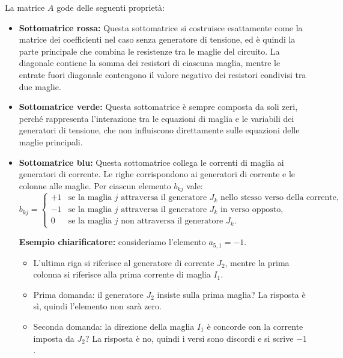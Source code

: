 La matrice $A$ gode delle seguenti proprietà:
\begin{itemize}
    \item \textbf{Sottomatrice rossa:} Questa sottomatrice si costruisce esattamente come la matrice dei coefficienti nel caso senza generatore di tensione, ed è quindi la parte principale che combina le resistenze tra le maglie del circuito. La diagonale contiene la somma dei resistori di ciascuna maglia, mentre le entrate fuori diagonale contengono il valore negativo dei resistori condivisi tra due maglie.

    \item \textbf{Sottomatrice verde:} Questa sottomatrice è sempre composta da soli zeri, perché rappresenta l’interazione tra le equazioni di maglia e le variabili dei generatori di tensione, che non influiscono direttamente sulle equazioni delle maglie principali.
    \item \textbf{Sottomatrice blu:} Questa sottomatrice collega le correnti di maglia ai generatori di corrente. Le righe corrispondono ai generatori di corrente e le colonne alle maglie. Per ciascun elemento \(b_{kj}\) vale:
          \[
              b_{kj} =
              \begin{cases}
                  +1 & \text{se la maglia } j \text{ attraversa il generatore } J_k \text{ nello stesso verso della corrente}, \\
                  -1 & \text{se la maglia } j \text{ attraversa il generatore } J_k \text{ in verso opposto},                  \\
                  0  & \text{se la maglia } j \text{ non attraversa il generatore } J_k.
              \end{cases}
          \]

          \textbf{Esempio chiarificatore:} consideriamo l'elemento \(a_{5,1} = -1\).
          \begin{itemize}
              \item L'ultima riga si riferisce al generatore di corrente \(J_2\), mentre la prima colonna si riferisce alla prima corrente di maglia \(I_1\).
              \item Prima domanda: il generatore \(J_2\) insiste sulla prima maglia? La risposta è sì, quindi l’elemento non sarà zero.
              \item Seconda domanda: la direzione della maglia \(I_1\) è concorde con la corrente imposta da \(J_2\)? La risposta è no, quindi i versi sono discordi e si scrive \(-1\).
          \end{itemize}


\end{itemize}
